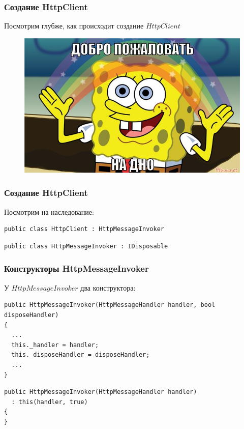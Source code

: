 \documentclass{beamer}
\begin{document}
\begin{frame}[fragile]
\frametitle{Создание HttpClient}
Посмотрим глубже, как происходит создание $HttpClient$
\newline
\begin{figure}
\includegraphics[scale=0.4]{dno}
\end{figure}
\end{frame}

\begin{frame}[fragile]
\frametitle{Создание HttpClient}
Посмотрим на наследование:
\newline
\begin{lstlisting}
public class HttpClient : HttpMessageInvoker
\end{lstlisting}
\begin{lstlisting}
public class HttpMessageInvoker : IDisposable
\end{lstlisting}
\end{frame}

\begin{frame}[fragile]
\frametitle{Конструкторы HttpMessageInvoker}
У $HttpMessageInvoker$ два конструктора:
\newline
\begin{lstlisting}
public HttpMessageInvoker(HttpMessageHandler handler, bool disposeHandler)
{
  ...
  this._handler = handler;
  this._disposeHandler = disposeHandler;
  ...
}
\end{lstlisting}
\begin{lstlisting}
public HttpMessageInvoker(HttpMessageHandler handler)
  : this(handler, true)
{
}
\end{lstlisting}
\end{frame}
\end{document}
